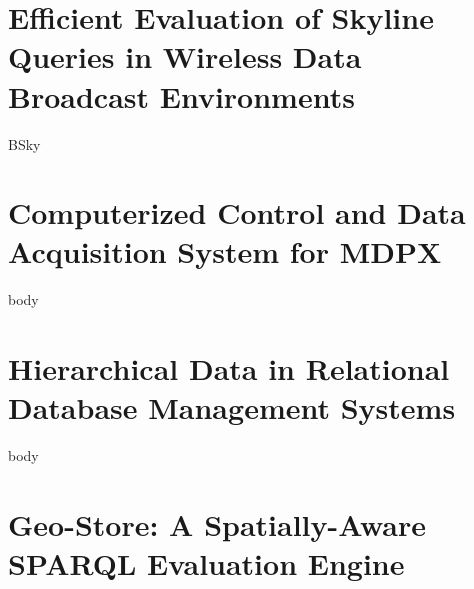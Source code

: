 \documentclass[12pt]{report}
\begin{document}
\begin{romanpages}

\tableofcontents
\listoffigures
\listoftables
\end{romanpages}        %



\chapter{Efficient Evaluation of Skyline Queries in Wireless Data Broadcast Environments}
{BSky}

\chapter{Computerized Control and Data Acquisition System for MDPX}
{body}

\chapter{Hierarchical Data in Relational Database Management Systems}
{body}


\chapter{Geo-Store: A Spatially-Aware SPARQL Evaluation Engine}


%

%
%




\end{document}
